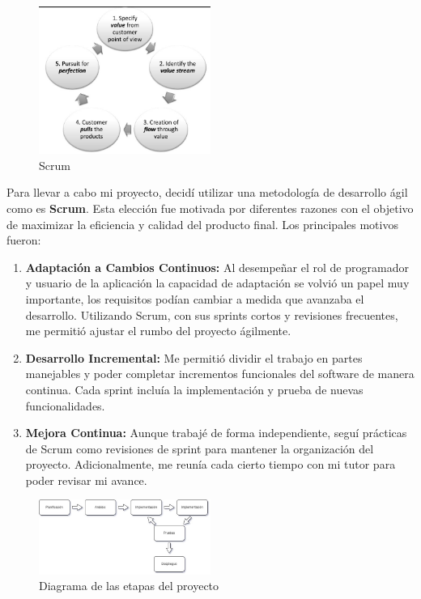 \begin{enumerate}
          \begin{figure}[H]
              \centering
              \includegraphics[width=0.5\textwidth]{imagenes/Lean.jpg}
              \caption{Scrum \cite{lean_img}}
              \label{fig:lean}
          \end{figure}

\end{enumerate}

Para llevar a cabo mi proyecto, decidí utilizar una metodología de desarrollo ágil como es \textbf{Scrum}. Esta elección fue motivada por diferentes razones con el objetivo de maximizar la eficiencia y calidad del producto final. Los principales motivos fueron:

\begin{enumerate}
    \item \textbf{Adaptación a Cambios Continuos:} Al desempeñar el rol de programador y usuario de la aplicación la capacidad de adaptación se volvió un papel muy importante, los requisitos podían cambiar a medida que avanzaba el desarrollo. Utilizando Scrum, con sus sprints cortos y revisiones frecuentes, me permitió ajustar el rumbo del proyecto ágilmente.

    \item \textbf{Desarrollo Incremental:} Me permitió dividir el trabajo en partes manejables y poder completar incrementos funcionales del software de manera continua. Cada sprint incluía la implementación y prueba de nuevas funcionalidades.

    \item \textbf{Mejora Continua:} Aunque trabajé de forma independiente, seguí prácticas de Scrum como revisiones de sprint para mantener la organización del proyecto. Adicionalmente, me reunía cada cierto tiempo con mi tutor para poder revisar mi avance.

\end{enumerate}

\begin{figure}[H]
    \centering
    \includegraphics[width=0.5\textwidth]{imagenes/DiagramaEtapas.jpg}
    \caption{Diagrama de las etapas del proyecto}
    \label{fig:diagrama_etapas}
\end{figure}


